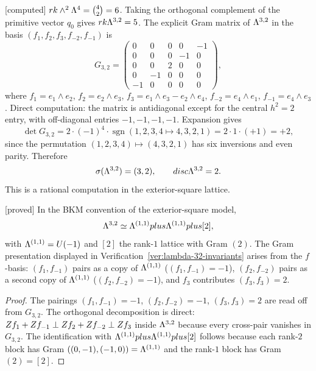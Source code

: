 \begin{verification}
\label{ver:lambda-32-invariants}
\textnormal{[computed]}
$rk\wedge^2\Lambda^4=\binom{4}{2}=6$.  Taking the orthogonal complement of
the primitive vector $q_0$ gives $rk\Lambda^{3,2}=5$.  The
explicit Gram matrix of $\Lambda^{3,2}$ in the basis
$(f_1,f_2,f_3,f_{-2},f_{-1})$ is
\[
G_{3,2}=\begin{pmatrix}
0&0&0&0&-1\\
0&0&0&-1&0\\
0&0&2&0&0\\
0&-1&0&0&0\\
-1&0&0&0&0
\end{pmatrix},
\]
where $f_1=e_1\wedge e_2$, $f_2=e_2\wedge e_3$,
$f_3=e_1\wedge e_3-e_2\wedge e_4$, $f_{-2}=e_4\wedge e_1$,
$f_{-1}=e_4\wedge e_3$.  Direct computation: the matrix is
antidiagonal except for the central $h^2=2$ entry, with off-diagonal
entries $-1,-1,-1,-1$.  Expansion gives
\[
\det G_{3,2}=2\cdot(-1)^4\cdot\operatorname{sgn}(1,2,3,4\mapsto4,3,2,1)
=2\cdot 1\cdot(+1)=+2,
\]
since the permutation $(1,2,3,4)\mapsto(4,3,2,1)$ has six inversions
and even parity.  Therefore
\[
\sigma(\Lambda^{3,2})=(3,2),\qquad
disc\Lambda^{3,2}=2.
\]
This is a rational computation in the exterior-square lattice.
\end{verification}

\begin{proposition}
\label{prop:lambda-32-decomposition}
\textnormal{[proved]}
In the BKM convention of the exterior-square model,
\[
\Lambda^{3,2}\simeq\Lambda^{(1,1)}plus\Lambda^{(1,1)}plus[2],
\]
with $\Lambda^{(1,1)}=U(-1)$ and $[2]$ the rank-$1$ lattice with Gram
$(2)$.  The Gram presentation displayed in
Verification~\ref{ver:lambda-32-invariants} arises from the
$f$-basis: $(f_1,f_{-1})$ pairs as a copy of $\Lambda^{(1,1)}$
($(f_1,f_{-1})=-1$), $(f_2,f_{-2})$ pairs as a second copy of
$\Lambda^{(1,1)}$ ($(f_2,f_{-2})=-1$), and $f_3$ contributes
$(f_3,f_3)=2$.
\end{proposition}

\begin{proof}
The pairings $(f_1,f_{-1})=-1$, $(f_2,f_{-2})=-1$, $(f_3,f_3)=2$ are
read off from $G_{3,2}$.  The orthogonal decomposition is direct:
$Z f_1+Z f_{-1}\perp Z f_2+Z f_{-2}\perp Z f_3$ inside
$\Lambda^{3,2}$ because every cross-pair vanishes in $G_{3,2}$.  The
identification with $\Lambda^{(1,1)}plus\Lambda^{(1,1)}plus[2]$ follows
because each rank-$2$ block has Gram $((0,-1),(-1,0))=\Lambda^{(1,1)}$
and the rank-$1$ block has Gram $(2)=[2]$.
\end{proof}

